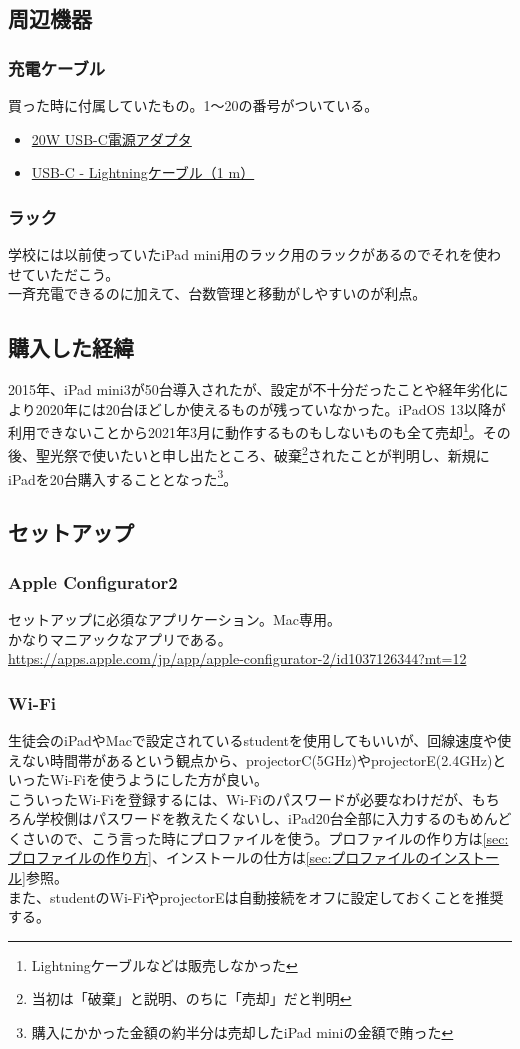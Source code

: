 \documentclass[a4paper]{ltjsreport}
\newcommand{\link}[2]{\href{#2}{#1}}
\begin{document}
\subsection{周辺機器}
\subsubsection{充電ケーブル}
買った時に付属していたもの。1〜20の番号がついている。
\begin{itemize}
  \item \link{20W USB-C電源アダプタ}{https://apple.co/3xeTw5G}
  \item \link{USB-C - Lightningケーブル（1 m）}{https://apple.co/3cGxn6D}
\end{itemize}
\subsubsection{ラック}
学校には以前使っていたiPad mini用のラック用のラックがあるのでそれを使わせていただこう。\\一斉充電できるのに加えて、台数管理と移動がしやすいのが利点。
\subsection{購入した経緯}
2015年、iPad mini3が50台導入されたが、設定が不十分だったことや経年劣化により2020年には20台ほどしか使えるものが残っていなかった。iPadOS 13以降が利用できないことから2021年3月に動作するものもしないものも全て売却\footnote{Lightningケーブルなどは販売しなかった}。その後、聖光祭で使いたいと申し出たところ、破棄\footnote{当初は「破棄」と説明、のちに「売却」だと判明}されたことが判明し、新規にiPadを20台購入することとなった\footnote{購入にかかった金額の約半分は売却したiPad miniの金額で賄った}。
\subsection{セットアップ}\label{sec:iPadのセットアップ}
\subsubsection{Apple Configurator2}
セットアップに必須なアプリケーション。Mac専用。\\
かなりマニアックなアプリである。\\
\url{https://apps.apple.com/jp/app/apple-configurator-2/id1037126344?mt=12}
\subsubsection{Wi-Fi}
生徒会のiPadやMacで設定されているstudentを使用してもいいが、回線速度や使えない時間帯があるという観点から、projectorC(5GHz)やprojectorE(2.4GHz)といったWi-Fiを使うようにした方が良い。\\
こういったWi-Fiを登録するには、Wi-Fiのパスワードが必要なわけだが、もちろん学校側はパスワードを教えたくないし、iPad20台全部に入力するのもめんどくさいので、こう言った時にプロファイルを使う。プロファイルの作り方は\ref{sec:プロファイルの作り方}、インストールの仕方は\ref{sec:プロファイルのインストール}参照。\\
また、studentのWi-FiやprojectorEは自動接続をオフに設定しておくことを推奨する。
\end{document}
